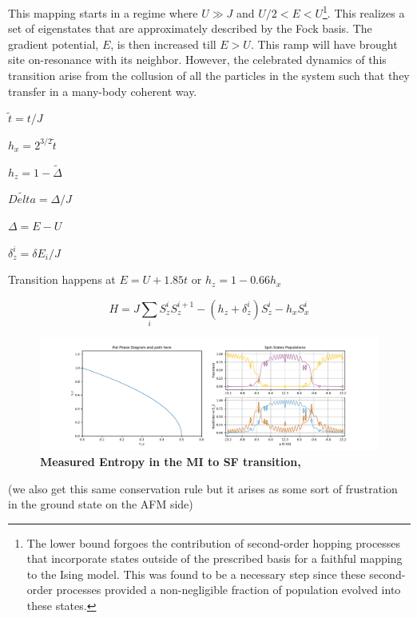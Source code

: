 This mapping starts in a regime where $U\gg J$ and $U/2<E<U$\footnote{The lower bound forgoes the contribution of second-order hopping processes that incorporate states outside of the prescribed basis for a faithful mapping to the Ising model. This was found to be a necessary step since these second-order processes provided a non-negligible fraction of population evolved into these states.}. This realizes a set of eigenstates that are approximately described by the Fock basis. The gradient potential, $E$, is then increased till $E>U$. This ramp will have brought site on-resonance with its neighbor. However, the celebrated dynamics of this transition arise from the collusion of all the particles in the system such that they transfer in a many-body coherent way.


$\tilde{t} = t/J$

$h_x = 2^{3/2}\tilde{t}$

$h_z = 1-\tilde{\Delta}$

$\tilde{Delta}=\Delta/J$

$\Delta = E-U$

$\delta_z^i = \delta E_i /J$

Transition happens at $E=U+1.85 t$ or $h_z = 1 - 0.66 h_x$

\begin{equation}
\label{eqn:isingHam}
H=J \sum_i S^i_z S^{i+1}_z - (h_z + \delta^i_z)S^i_z - h_x S^i_x
\end{equation}

\begin{figure}[h!]
		\includegraphics[width=\columnwidth]{figures/ch3/ising_data/IsingFig1.pdf} 
		\caption{\textbf{Measured Entropy in the MI to SF transition,}   }
		\label{fig:sf_mi_fig}	
\end{figure}


(we also get this same conservation rule but it arises as some sort of frustration in the ground state on the AFM side)
